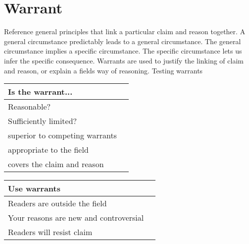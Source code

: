 \documentclass[10pt, a4paper]{article}
\begin{document}
	\section{Warrant}
	Reference general principles that link a particular claim and reason together. 
	A general circumstance predictably leads to a general circumstance. The general circumstance implies a specific circumstance. The specific circumstance lets us infer the specific consequence. Warrants are used to justify the linking of claim and reason, or explain a fields way of reasoning. 
	Testing warrants
	\begin{center}
		\begin{tabular}{|l |l|}
			\hline
			Is the warrant...&\\
			\hline
			Reasonable?&\\
			\hline
			Sufficiently limited?&\\
			\hline
			superior to competing warrants&\\
			\hline
			appropriate to the field&\\
			\hline
			covers the claim and reason&\\
			\hline
		\end{tabular}
	\end{center}
	
	\begin{center}
		\begin{tabular}{|l |l|}
			\hline
			Use warrants&\\
			\hline
			Readers are outside the field&\\
			\hline
			Your reasons are new and controversial&\\
			\hline
			Readers will resist claim&\\
			\hline
		\end{tabular}
	\end{center}
	
	
	
\end{document}
